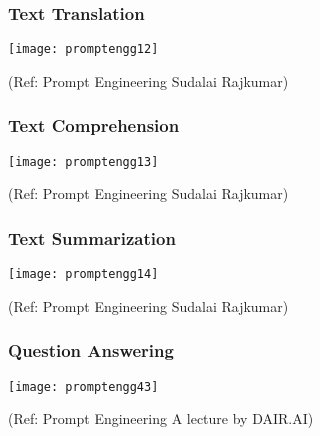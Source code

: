 \begin{frame}[fragile]\frametitle{Text Translation}

\begin{center}
\texttt{[image: promptengg12]}

{\tiny (Ref: Prompt Engineering Sudalai Rajkumar)}

\end{center}		
		


\end{frame}

\begin{frame}[fragile]\frametitle{Text Comprehension}

\begin{center}
\texttt{[image: promptengg13]}

{\tiny (Ref: Prompt Engineering Sudalai Rajkumar)}

\end{center}		
		


\end{frame}

\begin{frame}[fragile]\frametitle{Text Summarization}

\begin{center}
\texttt{[image: promptengg14]}

{\tiny (Ref: Prompt Engineering Sudalai Rajkumar)}

\end{center}		
		


\end{frame}


\begin{frame}[fragile]\frametitle{Question Answering}

\begin{center}
\texttt{[image: promptengg43]}

{\tiny (Ref: Prompt Engineering A lecture by DAIR.AI)}

\end{center}
\end{frame}


